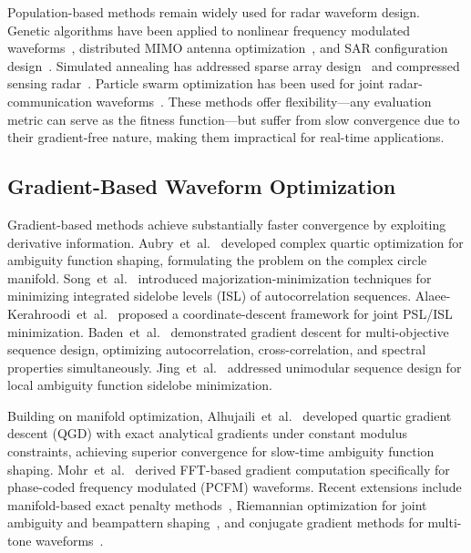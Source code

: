 \documentclass[journal]{IEEEtran}
\begin{document}
Population-based methods remain widely used for radar waveform design.
Genetic algorithms have been applied to nonlinear frequency modulated waveforms~\cite{kim2025modified}, distributed MIMO antenna optimization~\cite{maresca2024genetic}, and SAR configuration design~\cite{yang2025configuration}.
Simulated annealing has addressed sparse array design~\cite{farnane2020optimization} and compressed sensing radar~\cite{niu2025novel}.
Particle swarm optimization has been used for joint radar-communication waveforms~\cite{wang2022joint}.
These methods offer flexibility---any evaluation metric can serve as the fitness function---but suffer from slow convergence due to their gradient-free nature, making them impractical for real-time applications.

\subsection{Gradient-Based Waveform Optimization}

Gradient-based methods achieve substantially faster convergence by exploiting derivative information.
Aubry~et~al.~\cite{aubry2013ambiguity} developed complex quartic optimization for ambiguity function shaping, formulating the problem on the complex circle manifold.
Song~et~al.~\cite{song2015optimization} introduced majorization-minimization techniques for minimizing integrated sidelobe levels (ISL) of autocorrelation sequences.
Alaee-Kerahroodi~et~al.~\cite{alaee2017coordinate} proposed a coordinate-descent framework for joint PSL/ISL minimization.
Baden~et~al.~\cite{baden2018multiobjective} demonstrated gradient descent for multi-objective sequence design, optimizing autocorrelation, cross-correlation, and spectral properties simultaneously.
Jing~et~al.~\cite{jing2019designing} addressed unimodular sequence design for local ambiguity function sidelobe minimization.

Building on manifold optimization, Alhujaili~et~al.~\cite{alhujaili2020quartic, alhujaili2020dissertation} developed quartic gradient descent (QGD) with exact analytical gradients under constant modulus constraints, achieving superior convergence for slow-time ambiguity function shaping.
Mohr~et~al.~\cite{mohr2021gradient} derived FFT-based gradient computation specifically for phase-coded frequency modulated (PCFM) waveforms.
Recent extensions include manifold-based exact penalty methods~\cite{xiao2025unimodular}, Riemannian optimization for joint ambiguity and beampattern shaping~\cite{qiu2025constrained}, and conjugate gradient methods for multi-tone waveforms~\cite{reddy2025optimizing}.
\end{document}
